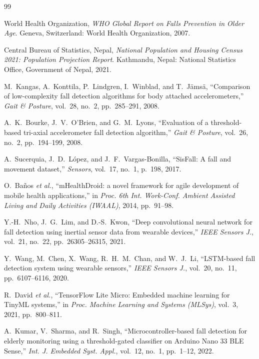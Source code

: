 \begin{thebibliography}{99}

World Health Organization, \textit{WHO Global Report on Falls Prevention in Older Age}. Geneva, Switzerland: World Health Organization, 2007.

Central Bureau of Statistics, Nepal, \textit{National Population and Housing Census 2021: Population Projection Report}. Kathmandu, Nepal: National Statistics Office, Government of Nepal, 2021.

M.~Kangas, A.~Konttila, P.~Lindgren, I.~Winblad, and T.~J{\"a}ms{\"a}, ``Comparison of low-complexity fall detection algorithms for body attached accelerometers,'' \textit{Gait \& Posture}, vol.~28, no.~2, pp.~285--291, 2008.

A.~K.~Bourke, J.~V.~O'Brien, and G.~M.~Lyons, ``Evaluation of a threshold-based tri-axial accelerometer fall detection algorithm,'' \textit{Gait \& Posture}, vol.~26, no.~2, pp.~194--199, 2008.

A.~Sucerquia, J.~D.~L{\'o}pez, and J.~F.~Vargas-Bonilla, ``SisFall: A fall and movement dataset,'' \textit{Sensors}, vol.~17, no.~1, p.~198, 2017.

O.~Ba{\~n}os \textit{et al.}, ``mHealthDroid: a novel framework for agile development of mobile health applications,'' in \textit{Proc. 6th Int. Work-Conf. Ambient Assisted Living and Daily Activities (IWAAL)}, 2014, pp.~91--98.

Y.-H.~Nho, J.~G.~Lim, and D.-S.~Kwon, ``Deep convolutional neural network for fall detection using inertial sensor data from wearable devices,'' \textit{IEEE Sensors J.}, vol.~21, no.~22, pp.~26305--26315, 2021.

Y.~Wang, M.~Chen, X.~Wang, R.~H.~M.~Chan, and W.~J.~Li, ``LSTM-based fall detection system using wearable sensors,'' \textit{IEEE Sensors J.}, vol.~20, no.~11, pp.~6107--6116, 2020.

R.~David \textit{et al.}, ``TensorFlow Lite Micro: Embedded machine learning for TinyML systems,'' in \textit{Proc. Machine Learning and Systems (MLSys)}, vol.~3, 2021, pp.~800--811.

A.~Kumar, V.~Sharma, and R.~Singh, ``Microcontroller-based fall detection for elderly monitoring using a threshold-gated classifier on Arduino Nano 33 BLE Sense,'' \textit{Int. J. Embedded Syst. Appl.}, vol.~12, no.~1, pp.~1--12, 2022.


\end{thebibliography}
